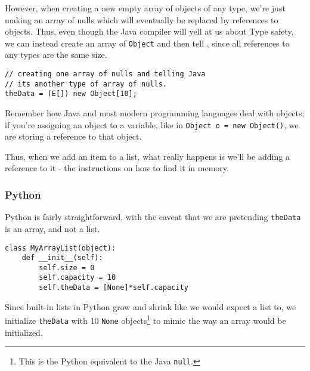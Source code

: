However, when creating a new empty array of objects of any type, we're just making an array of nulls which will eventually be replaced by references to objects.  Thus, even though the Java compiler will yell at us about Type safety, we can instead create an array of \texttt{Object} and then tell , since all references to any types are the same size.

\begin{verbatim}
// creating one array of nulls and telling Java 
// its another type of array of nulls. 
theData = (E[]) new Object[10];
\end{verbatim}



Remember how Java and most modern programming languages deal with objects; if you're assigning an object to a variable, like in \texttt{Object o = new Object()}, we are storing a reference to that object.

Thus, when we add an item to a list, what really happens is we'll be adding a reference to it - the instructions on how to find it in memory.
\subsubsection{Python}
Python is fairly straightforward, with the caveat that we are pretending \texttt{theData} is an array, and not a list.

\begin{verbatim}
class MyArrayList(object):
	def __init__(self):
		self.size = 0
		self.capacity = 10
		self.theData = [None]*self.capacity
\end{verbatim}

Since built-in lists in Python grow and shrink like we would expect a list to, we initialize \texttt{theData} with 10 \texttt{None} objects\footnote{This is the Python equivalent to the Java \texttt{null}.} to mimic the way an array would be initialized.


%
%
%

